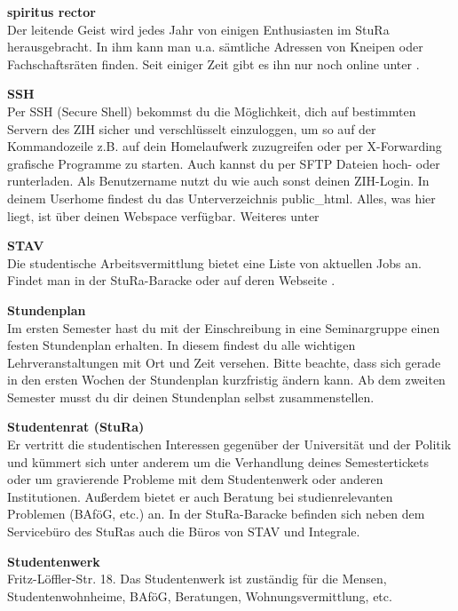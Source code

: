 \begin{multicols}{2}
\textbf{spiritus rector} \\
Der \glqq leitende Geist\grqq{} wird jedes Jahr von einigen Enthusiasten im StuRa herausgebracht.
In ihm kann man u.a. sämtliche Adressen von Kneipen oder Fachschaftsräten finden. Seit einiger Zeit gibt es ihn nur noch online unter .

\vfill\columnbreak

\textbf{SSH} \\
Per SSH (Secure Shell) bekommst du die Möglichkeit, dich auf bestimmten Servern des ZIH sicher und verschlüsselt einzuloggen, um so auf der Kommandozeile z.B. auf dein Homelaufwerk zuzugreifen oder per X-Forwarding grafische Programme zu starten.
Auch kannst du per SFTP Dateien hoch- oder runterladen.
Als Benutzername nutzt du wie auch sonst deinen ZIH-Login.
In deinem Userhome findest du das Unterverzeichnis public\_html.
Alles, was hier liegt, ist über deinen Webspace verfügbar. 
Weiteres unter 

\textbf{STAV} \\
Die studentische Arbeitsvermittlung bietet eine Liste von aktuellen Jobs an.
Findet man in der StuRa-Baracke oder auf deren Webseite .

\textbf{Stundenplan} \\
Im ersten Semester hast du mit der Einschreibung in eine Seminargruppe einen festen Stundenplan erhalten. In diesem findest du alle wichtigen Lehrveranstaltungen mit Ort und Zeit versehen. Bitte beachte, dass sich gerade in den ersten Wochen der Stundenplan kurzfristig ändern kann.
Ab dem zweiten Semester musst du dir deinen Stundenplan selbst zusammenstellen.

\textbf{Studentenrat (StuRa)} \\
Er vertritt die studentischen Interessen gegenüber der Universität und der Politik und kümmert sich unter anderem um die Verhandlung deines Semestertickets oder um gravierende Probleme mit dem Studentenwerk oder anderen Institutionen.
Außerdem bietet er auch Beratung bei studienrelevanten Problemen (BAföG, etc.) an.
In der StuRa-Baracke befinden sich neben dem Servicebüro des StuRas auch die Büros von STAV und Integrale. 

\textbf{Studentenwerk} \\
Fritz-Löffler-Str. 18.
Das Studentenwerk ist zuständig für die Mensen, Studentenwohnheime, BAföG, Beratungen, Wohnungsvermittlung, etc. 


\end{multicols}
